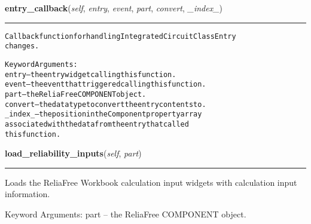     \label{reliafree:integrated_circuits:ic:IntegratedCircuit:entry_callback}

    \vspace{0.5ex}

\hspace{.8\funcindent}\begin{boxedminipage}{\funcwidth}

    \raggedright \textbf{entry\_callback}(\textit{self}, \textit{entry}, \textit{event}, \textit{part}, \textit{convert}, \textit{\_index\_})

    \vspace{-1.5ex}

    \rule{\textwidth}{0.5\fboxrule}
\setlength{\parskip}{2ex}
\begin{alltt}
Callback function for handling Integrated Circuit Class Entry
changes.

Keyword Arguments:
entry   -- the entry widget calling this function.
event   -- the event that triggered calling this function.
part    -- the ReliaFree COMPONENT object.
convert -- the data type to convert the entry contents to.
\_index\_ -- the position in the Component property array
           associated with the data from the entry that called
           this function.
\end{alltt}

\setlength{\parskip}{1ex}
    \end{boxedminipage}

    \label{reliafree:integrated_circuits:ic:IntegratedCircuit:load_reliability_inputs}

    \vspace{0.5ex}

\hspace{.8\funcindent}\begin{boxedminipage}{\funcwidth}

    \raggedright \textbf{load\_reliability\_inputs}(\textit{self}, \textit{part})

    \vspace{-1.5ex}

    \rule{\textwidth}{0.5\fboxrule}
\setlength{\parskip}{2ex}
    Loads the ReliaFree Workbook calculation input widgets with calculation
    input information.

    Keyword Arguments: part -- the ReliaFree COMPONENT object.

\setlength{\parskip}{1ex}
    \end{boxedminipage}

